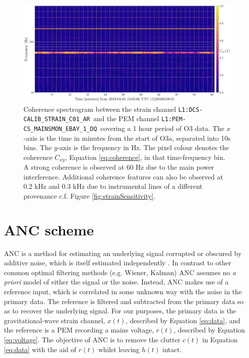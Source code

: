 \documentclass[pra,superscriptaddress,reprint,amsmath,amssymb,nofootinbib]{revtex4-2}
\newcommand{\StrainChanName}{\texttt{L1:DCS-CALIB\_STRAIN\_C01\_AR}}
\newcommand{\PEMChanName}{\texttt{L1:PEM-CS\_MAINSMON\_EBAY\_1\_DQ}}
\begin{document}
\begin{figure}
	\begin{center}
		\includegraphics[width=\textwidth]{images/coherence_spectrogram_canonical}
	\end{center}
	\caption{\label{correlation_1}
		Coherence spectrogram between the strain channel \StrainChanName  \, and the PEM channel \PEMChanName  	\, covering a 1 hour period of O3 data. The $x$-axis is the time in minutes from the start of O3a, separated into 10s bins. The $y$-axis is the frequency in Hz. The pixel colour denotes the coherence $C_{xy}$, Equation \eqref{eq:coherence}, in that time-frequency bin. A strong coherence is observed at 60 Hz due to the main power interference. Additional coherence features can also be observed at 0.2 kHz and 0.3 kHz due to instrumental lines of a different provenance c.f. Figure \ref{fig:strainSensitivity}.}
\end{figure}



\section{ANC scheme}\label{sec:method}

ANC is a method for estimating an underlying signal corrupted or obscured by additive noise, which is itself estimated independently \cite{Widrow1451965}. In contrast to other common optimal filtering methods (e.g. Wiener, Kalman) ANC assumes no \textit{a priori} model of either the signal or the noise. Instead, ANC makes use of a reference input, which is correlated in some unknown way with the noise in the primary data. The reference is filtered and subtracted from the primary data so as to recover the underlying signal. For our purposes, the primary data is the gravitational-wave strain channel, $x(t)$, described by Equation \eqref{eq:data}, and the reference is a PEM recording a mains voltage, $r(t)$, described by Equation \eqref{eq:voltage}. The objective of ANC is to remove the clutter $c(t)$ in Equation \eqref{eq:data} with the aid of $r(t)$ whilst leaving $h(t)$ intact. \newline 
\end{document}
